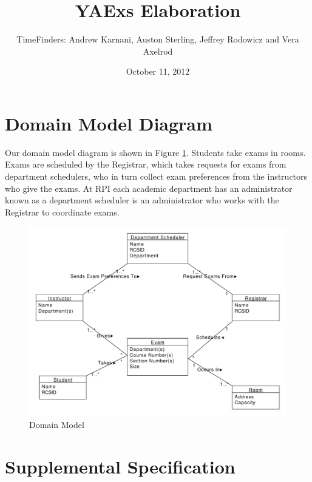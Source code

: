 \documentclass[11pt]{article}
\title{YAExs Elaboration}
\author{TimeFinders: Andrew Karnani, Auston Sterling, Jeffrey Rodowicz and Vera Axelrod}
\date{October 11, 2012}
\newcounter{id}
\begin{document}
\maketitle
\vspace{1in}
\tableofcontents

\clearpage
\section{Domain Model Diagram} %
Our domain model diagram is shown in Figure \ref{fig:Domain}.  Students take exams in rooms. Exams are scheduled by the Registrar, which takes requests for exams from department schedulers, who in turn collect exam preferences from the instructors who give the exams. At RPI each academic department has an administrator known as a  department scheduler is an administrator who works with the Registrar to coordinate exams.
\begin{figure}
	\centering
		\includegraphics[width = \textwidth]{domainDiagram.pdf}
	\caption{Domain Model}
	\label{fig:Domain}
\end{figure}

\cleardoublepage

\section{Supplemental Specification} %
\end{document}
